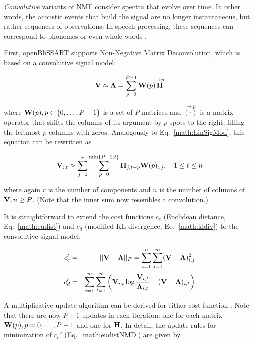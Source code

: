 \emph{Convolutive} variants of NMF 
consider spectra that evolve over time. In other words, the acoustic events
that build the signal are no longer instantaneous, but rather sequences of
observations. In speech processing, these sequences can correspond to phonemes
\cite{Smaragdis2007} or even whole words \cite{Smaragdis2004}. 

First, openBliSSART supports Non-Negative Matrix Deconvolution, which is based
on a convolutive signal model:

\begin{equation}
    \label{math:NMDFact}
    \mathbf{V} \approx \mathbf{\Lambda} = \sum\limits_{p=0}^{P-1} 
                                    \mathbf{W}(p) \overset{\rightarrow p}{\mathbf{H}}
\end{equation}

\noindent where $\mathbf{W}(p), p \in \{0,\dots,P-1\}$ is a set of $P$ matrices and
$\overset{\rightarrow p}{(\cdot)}$ is a matrix operator that shifts the
columns of its argument by $p$ spots to the right, filling the leftmost $p$
columns with zeros. Analogously to Eq.~\ref{math:LinSigMod}, this equation can
be rewritten as

\begin{equation}
    \label{math:ConvSigMod}
    \mathbf{V}_{:,t} \approx \sum\limits_{j=1}^r \sum\limits_{p=0}^{\min\{P-1,t\}}
    \mathbf{H}_{j,t-p} \mathbf{W}(p)_{:,j}, \quad 1 \leq t \leq n
\end{equation}

\noindent where again $r$ is the number of components and $n$ is the number of
columns of $\mathbf{V}, n \geq P$. (Note that the inner sum now resembles a
convolution.)

It is straightforward to extend the cost functions $c_e$ (Euclidean distance,
Eq.~\ref{math:eudist}) and $c_d$ (modified KL divergence, Eq.~\ref{math:kldiv})
to the convolutive signal model:

\begin{eqnarray}
    \label{math:eudistNMD}
    c_e' &=& ||\mathbf{V}-\mathbf{\Lambda}||_F = \sum\limits_{i=1}^n \sum\limits_{j=1}^m (\mathbf{V}-\mathbf{\Lambda})_{i,j}^2\\
    \label{math:kldivNMD}
    c_d' &=& \sum\limits_{i=1}^m \sum\limits_{t=1}^n
    \left( \mathbf{V}_{i,t} \log\frac{\mathbf{V}_{i,t}}{\mathbf{\Lambda}_{i,t}} - 
    (\mathbf{V} - \mathbf{\Lambda})_{i,t} \right)
\end{eqnarray}

A multiplicative update algorithm can be derived for either cost function
\cite{Smaragdis2004,WangNMD2009}. Note that there are now $P+1$ updates in each
iteration: one for each matrix $\mathbf{W}(p), p = 0, \dots, P-1$ and one for
$\mathbf{H}$. In detail, the update rules for minimization of $c_e'$
(Eq.~\ref{math:eudistNMD}) are given by

